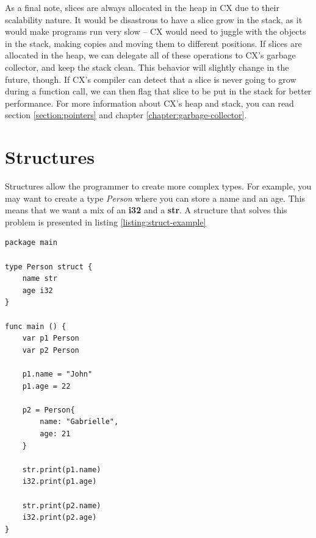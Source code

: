 \documentclass[11pt,fleqn,openany]{book} %
\begin{document}
As a final note, slices are always allocated in the heap in CX due to their scalability nature. It would be disastrous to have a slice grow in the stack, as it would make programs run very slow -- CX would need to juggle with the objects in the stack, making copies and moving them to different positions. If slices are allocated in the heap, we can delegate all of these operations to CX's garbage collector, and keep the stack clean. This behavior will slightly change in the future, though. If CX's compiler can detect that a slice is never going to grow during a function call, we can then flag that slice to be put in the stack for better performance. For more information about CX's heap and stack, you can read section \ref{section:pointers} and chapter \ref{chapter:garbage-collector}.

\section{Structures}


Structures allow the programmer to create more complex types. For example, you may want to create a type \emph{Person} where you can store a name and an age. This means that we want a mix of an \textbf{i32} and a \textbf{str}. A structure that solves this problem is presented in listing \ref{listing:struct-example}

\begin{lstlisting}[caption={Type $Person$ using structures},captionpos=b,label={listing:struct-example}]
package main

type Person struct {
	name str
    age i32
}

func main () {
    var p1 Person
    var p2 Person
    
    p1.name = "John"
    p1.age = 22
    
    p2 = Person{
        name: "Gabrielle",
        age: 21
    }
    
    str.print(p1.name)
    i32.print(p1.age)
    
    str.print(p2.name)
    i32.print(p2.age)
}
\end{lstlisting}
\end{document}
